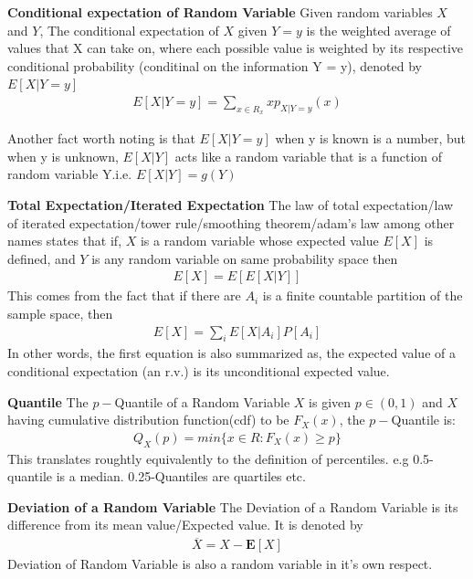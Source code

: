 \documentclass[10pt,a4paper]{article}
\begin{document}
	\begin{defn}{\textbf{Conditional expectation of Random Variable}}
		Given random variables $X$ and $Y$, The conditional expectation of $X$ given $Y = y$ is the weighted average of values that X can take on, where each possible value is weighted by its respective conditional probability (conditinal on the information Y = y), denoted by $E[X|Y = y]$
		\begin{align}
			E[X|Y = y] = \sum_{x \in R_x} xp_{X|Y = y}(x)
		\end{align}
		
		Another fact worth noting is that $E[X|Y=y]$ when y is known is a number, but when y is unknown, $E[X|Y]$ acts like a random variable that is a function of random variable Y.i.e. $E[X|Y] = g(Y)$
	\end{defn}

	\begin{defn}{\textbf{Total Expectation/Iterated Expectation}}
		The law of total expectation/law of iterated expectation/tower rule/smoothing theorem/adam's law among other names states that if,
		$X$ is a random variable whose expected value $E[X]$ is defined, and $Y$ is any random variable on same probability space then
		\begin{align}
			E[X] = E[E[X|Y]]
		\end{align}
		This comes from the fact that if there are $A_i$ is a finite countable partition of the sample space,
		then
		\begin{align}
			E[X] = \sum_{i}E[X|A_i]P[A_i]
		\end{align}
		In other words, the first equation is also summarized as, the expected value of a conditional expectation (an r.v.) is its unconditional expected value.
	\end{defn}

	\begin{defn}{\textbf{Quantile}}
	The $p-$Quantile of a Random Variable $X$ is given $p \in (0,1)$
	and $X$ having cumulative distribution function(cdf) to be $F_X(x)$, the $p-$Quantile is:
	\begin{align}
	Q_X(p) = min \{ x \in R : F_X(x) \ge p \}
	\end{align}
	This translates roughtly equivalently to the definition of percentiles. e.g 0.5-quantile is a median. 0.25-Quantiles are quartiles etc.
	\end{defn}

	\begin{defn}{\textbf{Deviation of a Random Variable}}
	The Deviation of a Random Variable is its difference from its mean value/Expected value. It is denoted by 
	\begin{align}
		\overline{X} = X - \mathbf{E}[X]
	\end{align}
	Deviation of Random Variable is also a random variable in it's
	own respect.
	\end{defn}
\end{document}
